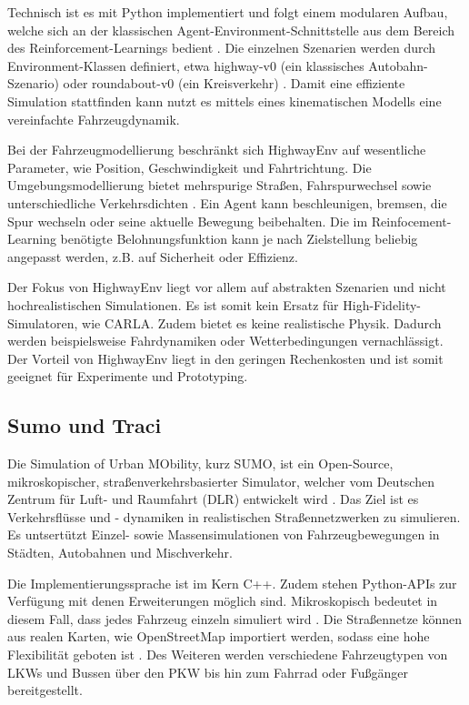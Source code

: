 Technisch ist es mit Python implementiert und folgt einem modularen Aufbau, welche sich an der klassischen Agent-Environment-Schnittstelle aus dem Bereich des Reinforcement-Learnings bedient \cite{highway-env}. Die einzelnen Szenarien werden durch Environment-Klassen definiert, etwa highway-v0 (ein klassisches Autobahn-Szenario) oder roundabout-v0 (ein Kreisverkehr) \cite{highway-env}. Damit eine effiziente Simulation stattfinden kann nutzt es mittels eines kinematischen Modells eine vereinfachte Fahrzeugdynamik.

Bei der Fahrzeugmodellierung beschränkt sich HighwayEnv auf wesentliche Parameter, wie Position, Geschwindigkeit und Fahrtrichtung. Die Umgebungsmodellierung bietet mehrspurige Straßen, Fahrspurwechsel sowie unterschiedliche Verkehrsdichten \cite{highway-env}. Ein Agent kann beschleunigen, bremsen, die Spur wechseln oder seine aktuelle Bewegung beibehalten. Die im Reinfocement-Learning benötigte Belohnungsfunktion kann je nach Zielstellung beliebig angepasst werden, z.B. auf Sicherheit oder Effizienz. 

Der Fokus von HighwayEnv liegt vor allem auf abstrakten Szenarien und nicht hochrealistischen Simulationen. Es ist somit kein Ersatz für High-Fidelity-Simulatoren, wie CARLA. Zudem bietet es keine realistische Physik. Dadurch werden beispielsweise Fahrdynamiken oder Wetterbedingungen vernachlässigt. Der Vorteil von HighwayEnv liegt in den geringen Rechenkosten und ist somit geeignet für Experimente und Prototyping.
\subsection{Sumo und Traci}
Die Simulation of Urban MObility, kurz SUMO, ist ein Open-Source, mikroskopischer, straßenverkehrsbasierter Simulator, welcher vom Deutschen Zentrum für Luft- und Raumfahrt (DLR) entwickelt wird \cite{SUMO2018}. Das Ziel ist es Verkehrsflüsse und - dynamiken in realistischen Straßennetzwerken zu simulieren. Es untsertützt Einzel- sowie Massensimulationen von Fahrzeugbewegungen in Städten, Autobahnen und Mischverkehr.

Die Implementierungssprache ist im Kern C++. Zudem stehen Python-APIs zur Verfügung mit denen Erweiterungen möglich sind. Mikroskopisch bedeutet in diesem Fall, dass jedes Fahrzeug einzeln simuliert wird \cite{sumo_at_a_glance}. Die Straßennetze können aus realen Karten, wie OpenStreetMap importiert werden, sodass eine hohe Flexibilität geboten ist \cite{sumo_open_street_map}. Des Weiteren werden verschiedene Fahrzeugtypen von LKWs und Bussen über den PKW bis hin zum Fahrrad oder Fußgänger bereitgestellt.

